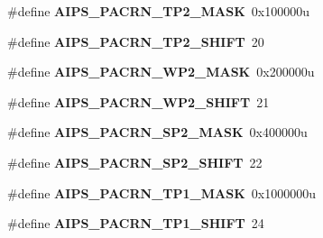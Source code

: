 \begin{DoxyCompactItemize}
\item 
\hypertarget{group___a_i_p_s___register___masks_ga42c229b1d1a656e908140ce42f69dea0}{}\#define {\bfseries A\+I\+P\+S\+\_\+\+P\+A\+C\+R\+N\+\_\+\+T\+P2\+\_\+\+M\+A\+S\+K}~0x100000u\label{group___a_i_p_s___register___masks_ga42c229b1d1a656e908140ce42f69dea0}

\item 
\hypertarget{group___a_i_p_s___register___masks_ga55264ac15000e7a65c1b3ece9ce50c2a}{}\#define {\bfseries A\+I\+P\+S\+\_\+\+P\+A\+C\+R\+N\+\_\+\+T\+P2\+\_\+\+S\+H\+I\+F\+T}~20\label{group___a_i_p_s___register___masks_ga55264ac15000e7a65c1b3ece9ce50c2a}

\item 
\hypertarget{group___a_i_p_s___register___masks_ga808a3a41e8c2169a806b5b8376dcfe72}{}\#define {\bfseries A\+I\+P\+S\+\_\+\+P\+A\+C\+R\+N\+\_\+\+W\+P2\+\_\+\+M\+A\+S\+K}~0x200000u\label{group___a_i_p_s___register___masks_ga808a3a41e8c2169a806b5b8376dcfe72}

\item 
\hypertarget{group___a_i_p_s___register___masks_ga8a5a52975a1ef41510845556222bc10d}{}\#define {\bfseries A\+I\+P\+S\+\_\+\+P\+A\+C\+R\+N\+\_\+\+W\+P2\+\_\+\+S\+H\+I\+F\+T}~21\label{group___a_i_p_s___register___masks_ga8a5a52975a1ef41510845556222bc10d}

\item 
\hypertarget{group___a_i_p_s___register___masks_ga3d358a7ce59552bbd61d80ea13e0af33}{}\#define {\bfseries A\+I\+P\+S\+\_\+\+P\+A\+C\+R\+N\+\_\+\+S\+P2\+\_\+\+M\+A\+S\+K}~0x400000u\label{group___a_i_p_s___register___masks_ga3d358a7ce59552bbd61d80ea13e0af33}

\item 
\hypertarget{group___a_i_p_s___register___masks_ga40c250cc4e6aea6ff7114e697930dbcb}{}\#define {\bfseries A\+I\+P\+S\+\_\+\+P\+A\+C\+R\+N\+\_\+\+S\+P2\+\_\+\+S\+H\+I\+F\+T}~22\label{group___a_i_p_s___register___masks_ga40c250cc4e6aea6ff7114e697930dbcb}

\item 
\hypertarget{group___a_i_p_s___register___masks_ga635455c5582700c509c92e57da0d2951}{}\#define {\bfseries A\+I\+P\+S\+\_\+\+P\+A\+C\+R\+N\+\_\+\+T\+P1\+\_\+\+M\+A\+S\+K}~0x1000000u\label{group___a_i_p_s___register___masks_ga635455c5582700c509c92e57da0d2951}

\item 
\hypertarget{group___a_i_p_s___register___masks_ga180bcf6b74808060fb32888e0c55df14}{}\#define {\bfseries A\+I\+P\+S\+\_\+\+P\+A\+C\+R\+N\+\_\+\+T\+P1\+\_\+\+S\+H\+I\+F\+T}~24\label{group___a_i_p_s___register___masks_ga180bcf6b74808060fb32888e0c55df14}


\end{DoxyCompactItemize}
